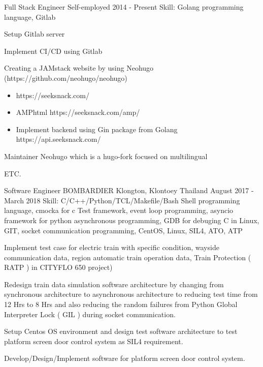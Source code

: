 \begin{cventries}
  \cventry
    {Full Stack Engineer} %
    {Self-employed} %
    {} %
    {2014 - Present} %
    {Skill: Golang programming language, Gitlab} %
    {
      \begin{cvitems} %
        \item {Setup Gitlab server}
        \item {Implement CI/CD using Gitlab}
        \item {Creating a JAMstack website by using Neohugo
              (https://github.com/neohugo/neohugo) }
         \begin{itemize}
           \item https://seeksnack.com/
           \item AMPhtml https://seeksnack.com/amp/
           \item Implement backend using Gin package from Golang
             https://api.seeksnack.com/
         \end{itemize}
        \item {Maintainer Neohugo which is a hugo-fork focused on multilingual}
        \item {ETC.}
      \end{cvitems}
    }

  \cventry
    {Software Engineer} %
    {BOMBARDIER} %
    {Klongton, Klontoey Thailand} %
    {August 2017 - March 2018} %
    {Skill: C/C++/Python/TCL/Makefile/Bash Shell programming language, cmocka
    for c Test framework, event loop programming,
    asyncio framework for python asynchronous programming,
    GDB for debuging C in Linux, GIT, socket communication
    programming, CentOS, Linux, SIL4, ATO, ATP } %
    {
      \begin{cvitems} %
       \item {Implement test case for electric train with specific condition, wayside communication
          data, region automatic train operation data, Train Protection ( RATP
          ) in CITYFLO 650 project)}
       \item {Redesign train data simulation software architecture by changing
          from synchronous architecture to asynchronous architecture to reducing test
          time from 12 Hrs to 8 Hrs and also reducing the random failures from 
          Python Global Interpreter Lock ( GIL ) during socket communication.}
       \item {Setup Centos OS environment and design test software architecture
       to test platform screen door control system as SIL4 requirement.}
       \item {Develop/Design/Implement software for platform screen door control
         system.}
      \end{cvitems}
    }


\end{cventries}
